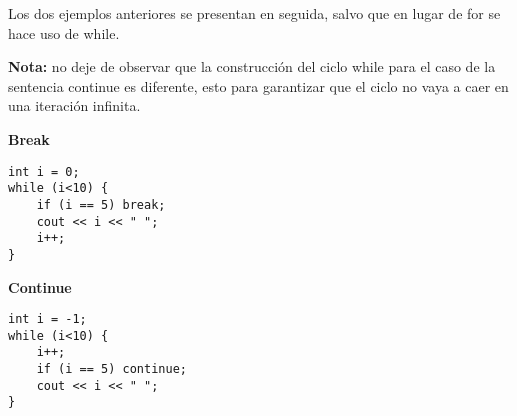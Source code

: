 Los dos ejemplos anteriores se presentan en seguida, salvo que en lugar de for se hace uso de while.

\textbf{Nota:} no deje de observar que la construcción del ciclo while para el caso de la sentencia continue es diferente, esto para garantizar que el ciclo no vaya a caer en una iteración infinita.

\begin{center}
	\textbf{Break}
\end{center}

\begin{lstlisting}[style=Cpp, label=break-while, caption=Break While]
int i = 0;
while (i<10) {
    if (i == 5) break;
    cout << i << " ";
    i++;
}
\end{lstlisting}

\begin{center}
	\textbf{Continue}
\end{center}

\begin{lstlisting}[style=Cpp, label=continue-while, caption=Continue While]
int i = -1;
while (i<10) {
    i++;
    if (i == 5) continue;
    cout << i << " ";
}
\end{lstlisting}
